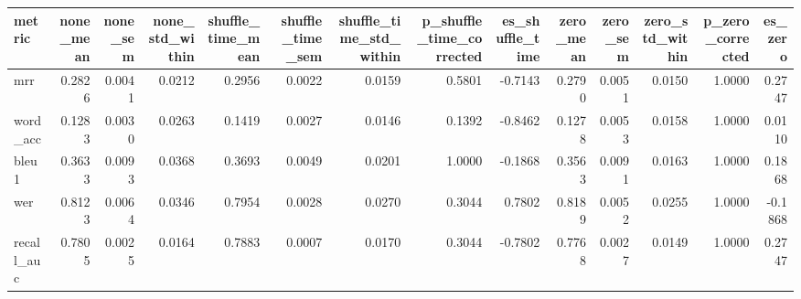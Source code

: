 \begin{tabular}{lrrrrrrrrrrrrr}
\toprule
metric & none_mean & none_sem & none_std_within & shuffle_time_mean & shuffle_time_sem & shuffle_time_std_within & p_shuffle_time_corrected & es_shuffle_time & zero_mean & zero_sem & zero_std_within & p_zero_corrected & es_zero \\
\midrule
mrr & 0.2826 & 0.0041 & 0.0212 & 0.2956 & 0.0022 & 0.0159 & 0.5801 & -0.7143 & 0.2790 & 0.0051 & 0.0150 & 1.0000 & 0.2747 \\
word_acc & 0.1283 & 0.0030 & 0.0263 & 0.1419 & 0.0027 & 0.0146 & 0.1392 & -0.8462 & 0.1278 & 0.0053 & 0.0158 & 1.0000 & 0.0110 \\
bleu1 & 0.3633 & 0.0093 & 0.0368 & 0.3693 & 0.0049 & 0.0201 & 1.0000 & -0.1868 & 0.3563 & 0.0091 & 0.0163 & 1.0000 & 0.1868 \\
wer & 0.8123 & 0.0064 & 0.0346 & 0.7954 & 0.0028 & 0.0270 & 0.3044 & 0.7802 & 0.8189 & 0.0052 & 0.0255 & 1.0000 & -0.1868 \\
recall_auc & 0.7805 & 0.0025 & 0.0164 & 0.7883 & 0.0007 & 0.0170 & 0.3044 & -0.7802 & 0.7768 & 0.0027 & 0.0149 & 1.0000 & 0.2747 \\
\bottomrule
\end{tabular}
